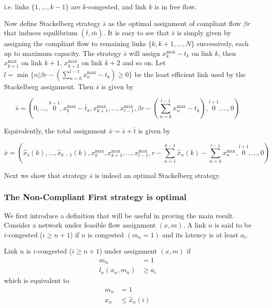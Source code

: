 i.e. links $\{1, \dots, k-1 \}$ are $k$-congested, and link $k$ is in free flow.

Now define Stackelberg strategy $\bar{s}$ as the optimal assignment of compliant flow $\beta r$ that induces equilibrium $(\bar{t}, \bar{m})$. It is easy to see that $\bar{s}$ is simply given by assigning the compliant flow to remaining links $\{k, k + 1, \dots, N\}$ successively, each up to maximum capacity. 
The strategy $\bar{s}$ will assign $x^{\max}_{k} - t_{k}$ on link $k$, then $x_{k + 1}^{\max}$ on link $k + 1$, $x_{k+2}^{\max}$ on link $k+2$ and so on.
Let $l = \min \{n | \beta r - (\sum_{n = k}^{l-1}x^{\max}_n - t_{k}) \geq 0 \}$ be the least efficient link used by the Stackelberg assignment. Then $\bar{s}$ is given by

\[
\bar{s} = \left(0, \dots, \stackrel{k-1}{0}, 
x_{k}^{\max} - \bar{t}_{k}, 
x_{k+1}^{\max}, \dots,  x_{l-1}^{\max}, 
\beta r - (\sum_{n = k}^{l-1}x_n^{\max} - t_{k}), 
\stackrel{l+1}{0}, \dots, 0 \right)
\]

Equivalently, the total assignment $\bar{x} = \bar{s} + \bar{t}$ is given by

\[
\bar{x} = \left(
\hat{x}_1(k), \dots, \hat{x}_{k - 1}(k), 
x_{k}^{\max}, 
x_{k+1}^{\max}, \dots,  x_{l-1}^{\max}, 
r - \sum_{n = 1}^{k-1}\hat{x}_n(k) - \sum_{n = k}^{l-1}x_n^{\max}, 
\stackrel{l+1}{0}, \dots, 0 \right)
\]

Next we show that strategy $\bar{s}$ is indeed an optimal Stackelberg strategy.


\subsubsection{The Non-Compliant First strategy is optimal}
We first introduce a definition that will be useful in proving the main result. Consider a network under feasible flow assignment $(x, m)$. A link $n$ is said to be $i$-congested ($i \geq n+1$) if $n$ is congested $(m_n = 1)$ and its latency is at least $a_i$.

\begin{definition}
Link $n$ is $i$-congested ($i \geq n+1$) under assignment $(x, m)$ if
\begin{align*}
m_n &= 1 \\
l_n(x_n, m_n) &\geq a_i
\end{align*}
which is equivalent to 
\begin{align*}
m_n &= 1 \\
x_n &\leq \hat{x}_n(i)
\end{align*}
\end{definition}

